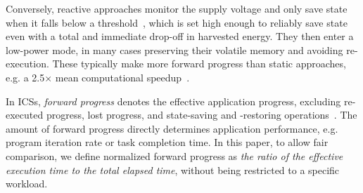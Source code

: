 Conversely, reactive approaches monitor the supply voltage and only save state when it falls below a threshold~\cite{7442814, 7849206, 7807254}, which is set high enough to reliably save state even with a total and immediate drop-off in harvested energy. They then enter a low-power mode, in many cases preserving their volatile memory and avoiding re-execution. These typically make more forward progress than static approaches, e.g. a 2.5$\times$ mean computational speedup~\cite{Maeng:2019:SPI:3314221.3314613}. 



In ICSs, \textit{forward progress} denotes the effective application progress, excluding re-executed progress, lost progress, and state-saving and -restoring operations~\cite{7478428}. The amount of forward progress directly determines application performance, e.g. program iteration rate or task completion time. In this paper, to allow fair comparison, we define normalized forward progress as \textit{the ratio of the effective execution time to the total elapsed time}, without being restricted to a specific workload. 


